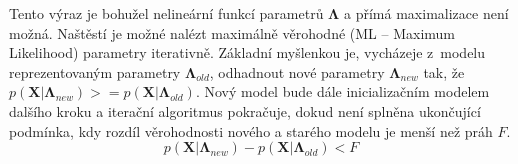 Tento výraz je bohužel nelineární funkcí parametrů $\mathbf{\Lambda}$ a přímá maximalizace není možná. Naštěstí je možné nalézt maximálně věrohodné (ML -- Maximum Likelihood) parametry iterativně. Základní myšlenkou je, vycházeje z~modelu reprezentovaným parametry $\mathbf{\Lambda}_{old}$, odhadnout nové parametry $\mathbf{\Lambda}_{new}$ tak, že $p(\mathbf{X}|\mathbf{\Lambda}_{new}) >= p(\mathbf{X}|\mathbf{\Lambda}_{old})$. Nový model bude dále inicializačním modelem dalšího kroku a iterační algoritmus pokračuje, dokud není splněna ukončující podmínka, kdy rozdíl věrohodnosti nového a starého modelu je menší než práh $F$.
\begin{equation}
    \label{eqn:GMM_thresh}
   p(\mathbf{X}|\mathbf{\Lambda}_{new}) - p(\mathbf{X}|\mathbf{\Lambda}_{old}) < F
\end{equation}

